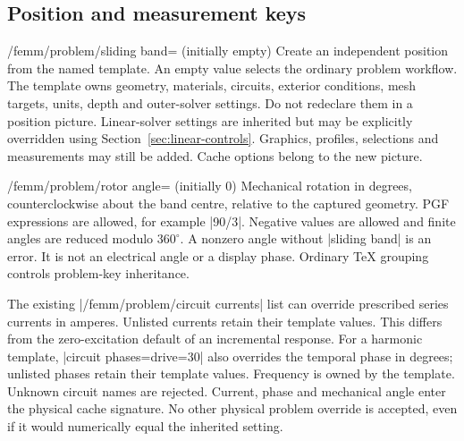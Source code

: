 \subsection{Position and measurement keys}
\begin{key}{/femm/problem/sliding band= (initially empty)}
Create an independent position from the named template. An empty value selects
the ordinary problem workflow. The template owns geometry, materials, circuits,
exterior conditions, mesh targets, units, depth and outer-solver settings. Do not
redeclare them in a position picture. Linear-solver settings are inherited but
may be explicitly overridden using Section~\ref{sec:linear-controls}. Graphics, profiles, selections and
measurements may still be added. Cache options belong to the new picture.
\end{key}
\begin{key}{/femm/problem/rotor angle= (initially 0)}
Mechanical rotation in degrees, counterclockwise about the band centre, relative
to the captured geometry. PGF expressions are allowed, for example |90/3|.
Negative values are allowed and finite angles are reduced modulo $360^\circ$.
A nonzero angle without |sliding band| is an error. It is not an electrical
angle or a display phase. Ordinary TeX grouping controls problem-key inheritance.
\end{key}
The existing |/femm/problem/circuit currents| list can override prescribed
series currents in amperes. Unlisted currents retain their template values.
This differs from the zero-excitation default of an incremental response.
For a harmonic template, |circuit phases={drive=30}| also overrides the temporal
phase in degrees; unlisted phases retain their template values. Frequency is
owned by the template. Unknown circuit names are rejected. Current, phase and
mechanical angle enter the physical cache signature. No other physical problem override
is accepted, even if it would numerically equal the inherited setting.

